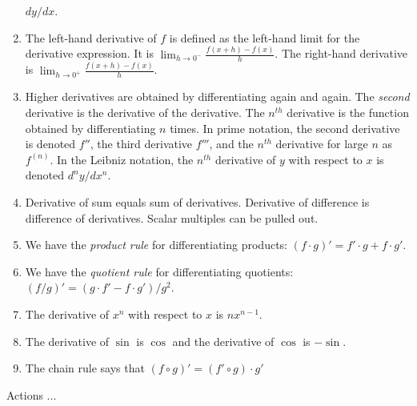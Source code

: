\documentclass[10pt]{amsart}
\begin{document}
\begin{enumerate}
  $dy/dx$.
\item The left-hand derivative of $f$ is defined as the left-hand
  limit for the derivative expression. It is $\lim_{h \to 0^-}
  \frac{f(x + h) - f(x)}{h}$. The right-hand derivative is $\lim_{h
  \to 0^+} \frac{f(x + h) - f(x)}{h}$.
\item Higher derivatives are obtained by differentiating again and
  again. The {\em second} derivative is the derivative of the
  derivative. The $n^{th}$ derivative is the function obtained by
  differentiating $n$ times. In prime notation, the second derivative
  is denoted $f''$, the third derivative $f'''$, and the $n^{th}$
  derivative for large $n$ as $f^{(n)}$. In the Leibniz notation, the
  $n^{th}$ derivative of $y$ with respect to $x$ is denoted
  $d^ny/dx^n$.
\item Derivative of sum equals sum of derivatives. Derivative of
  difference is difference of derivatives. Scalar multiples can be pulled out.
\item We have the {\em product rule} for differentiating products: $(f
  \cdot g)' = f' \cdot g + f \cdot g'$.
\item We have the {\em quotient rule} for differentiating quotients:
  $(f/g)' = (g \cdot f' - f \cdot g')/g^2$.
\item The derivative of $x^n$ with respect to $x$ is $nx^{n-1}$.
\item The derivative of $\sin$ is $\cos$ and the derivative of $\cos$
  is $-\sin$.
\item The chain rule says that $(f \circ g)' = (f' \circ g) \cdot g'$
\end{enumerate}

Actions ...
\end{document}
